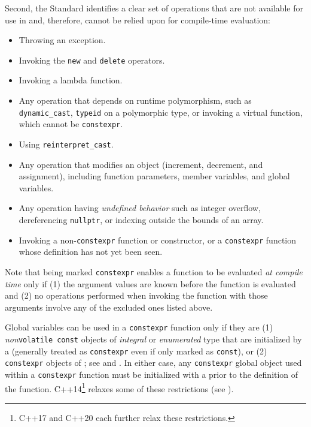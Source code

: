 Second, the Standard identifies a clear set of operations that are not
available for use in  and, therefore,
cannot be relied upon for compile-time evaluation:

\begin{itemize}
\item{Throwing an exception.}
\item{Invoking the \lstinline!new! and \lstinline!delete! operators.}
\item{Invoking a lambda function.}
\item{Any operation that depends on runtime polymorphism, such as \lstinline!dynamic_cast!, \lstinline!typeid! on a polymorphic type, or invoking a virtual function, which cannot be \lstinline!constexpr!.}
\item{Using \lstinline!reinterpret_cast!.}
\item{Any operation that modifies an object (increment, decrement, and assignment), including function parameters, member variables, and global variables.}
\item{Any operation having \emph{undefined behavior} such as integer overflow, dereferencing \lstinline!nullptr!, or indexing outside the bounds of an array.}
\item{Invoking a non-\lstinline!constexpr! function or constructor, or a \lstinline!constexpr! function whose definition has not yet been seen.}
\end{itemize}

Note that being marked \lstinline!constexpr! enables a function to be
evaluated \emph{at compile time} only if (1) the argument values are
 known before the function is evaluated and
(2) no operations performed when invoking the function with those
arguments involve any of the excluded ones listed above.

Global variables can be used in a \lstinline!constexpr! function only if
they are (1) \emph{non}\lstinline!volatile!~\lstinline!const! objects of
\emph{integral} or \emph{enumerated} type that are initialized by a
 (generally treated as \lstinline!constexpr!
even if only marked as \lstinline!const!), or (2) \lstinline!constexpr!
objects of ; see  and . In either
case, any \lstinline!constexpr! global object used within a
\lstinline!constexpr! function must be initialized with a  prior to the definition of the function.
C++14{\cprotect\footnote{C++17 and C++20 each further relax these
  restrictions.}} relaxes some of these restrictions (see ).

